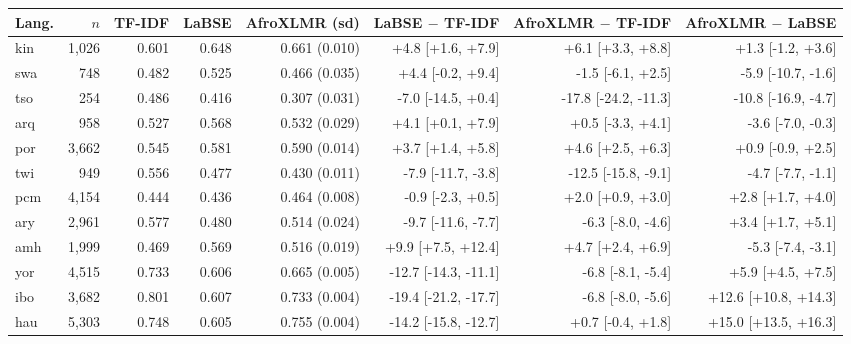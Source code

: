\begin{tabular}{lrrrrrrr}
\toprule
Lang. & $n$ & TF-IDF & LaBSE & AfroXLMR (sd) & LaBSE $-$ TF-IDF & AfroXLMR $-$ TF-IDF & AfroXLMR $-$ LaBSE \\
\midrule
kin & 1,026 & 0.601 & 0.648 & 0.661 (0.010) & +4.8 [+1.6, +7.9] & +6.1 [+3.3, +8.8] & +1.3 [-1.2, +3.6] \\
swa & 748 & 0.482 & 0.525 & 0.466 (0.035) & +4.4 [-0.2, +9.4] & -1.5 [-6.1, +2.5] & -5.9 [-10.7, -1.6] \\
tso & 254 & 0.486 & 0.416 & 0.307 (0.031) & -7.0 [-14.5, +0.4] & -17.8 [-24.2, -11.3] & -10.8 [-16.9, -4.7] \\
arq & 958 & 0.527 & 0.568 & 0.532 (0.029) & +4.1 [+0.1, +7.9] & +0.5 [-3.3, +4.1] & -3.6 [-7.0, -0.3] \\
por & 3,662 & 0.545 & 0.581 & 0.590 (0.014) & +3.7 [+1.4, +5.8] & +4.6 [+2.5, +6.3] & +0.9 [-0.9, +2.5] \\
twi & 949 & 0.556 & 0.477 & 0.430 (0.011) & -7.9 [-11.7, -3.8] & -12.5 [-15.8, -9.1] & -4.7 [-7.7, -1.1] \\
pcm & 4,154 & 0.444 & 0.436 & 0.464 (0.008) & -0.9 [-2.3, +0.5] & +2.0 [+0.9, +3.0] & +2.8 [+1.7, +4.0] \\
ary & 2,961 & 0.577 & 0.480 & 0.514 (0.024) & -9.7 [-11.6, -7.7] & -6.3 [-8.0, -4.6] & +3.4 [+1.7, +5.1] \\
amh & 1,999 & 0.469 & 0.569 & 0.516 (0.019) & +9.9 [+7.5, +12.4] & +4.7 [+2.4, +6.9] & -5.3 [-7.4, -3.1] \\
yor & 4,515 & 0.733 & 0.606 & 0.665 (0.005) & -12.7 [-14.3, -11.1] & -6.8 [-8.1, -5.4] & +5.9 [+4.5, +7.5] \\
ibo & 3,682 & 0.801 & 0.607 & 0.733 (0.004) & -19.4 [-21.2, -17.7] & -6.8 [-8.0, -5.6] & +12.6 [+10.8, +14.3] \\
hau & 5,303 & 0.748 & 0.605 & 0.755 (0.004) & -14.2 [-15.8, -12.7] & +0.7 [-0.4, +1.8] & +15.0 [+13.5, +16.3] \\
\bottomrule
\end{tabular}
